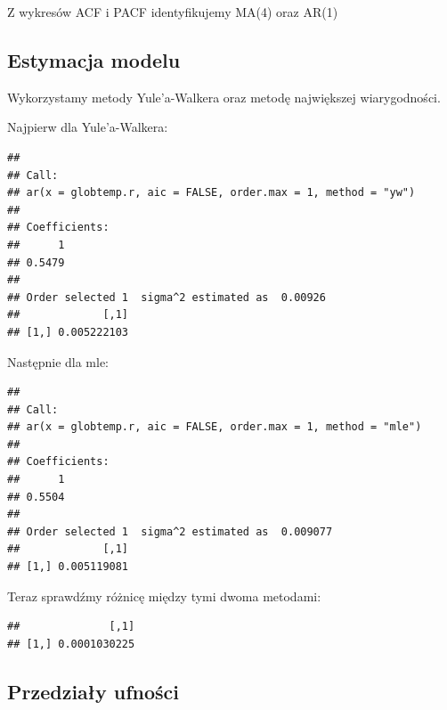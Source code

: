 \documentclass[12pt, a4paper]{article}\usepackage[]{graphicx}\usepackage[]{color}
\makeatletter
\newenvironment{kframe}{%
 \def\at@end@of@kframe{}%
 \ifinner\ifhmode%
  \def\at@end@of@kframe{\end{minipage}}%
  \begin{minipage}{\columnwidth}%
 \fi\fi%
 \def\FrameCommand##1{\hskip\@totalleftmargin \hskip-\fboxsep
 \colorbox{shadecolor}{##1}\hskip-\fboxsep
     \hskip-\linewidth \hskip-\@totalleftmargin \hskip\columnwidth}%
 \MakeFramed {\advance\hsize-\width
   \@totalleftmargin\z@ \linewidth\hsize
   \@setminipage}}%
 {\par\unskip\endMakeFramed%
 \at@end@of@kframe}
\newenvironment{knitrout}{}{} %
\makeatother
\begin{document}
Z wykresów ACF i PACF identyfikujemy MA(4) oraz AR(1)

\subsection{Estymacja modelu}

Wykorzystamy metody Yule'a-Walkera oraz metodę największej wiarygodności.

Najpierw dla Yule'a-Walkera:

\begin{knitrout}
\color{fgcolor}\begin{kframe}
\begin{verbatim}
## 
## Call:
## ar(x = globtemp.r, aic = FALSE, order.max = 1, method = "yw")
## 
## Coefficients:
##      1  
## 0.5479  
## 
## Order selected 1  sigma^2 estimated as  0.00926
##             [,1]
## [1,] 0.005222103
\end{verbatim}
\end{kframe}
\end{knitrout}

Następnie dla mle:

\begin{knitrout}
\color{fgcolor}\begin{kframe}
\begin{verbatim}
## 
## Call:
## ar(x = globtemp.r, aic = FALSE, order.max = 1, method = "mle")
## 
## Coefficients:
##      1  
## 0.5504  
## 
## Order selected 1  sigma^2 estimated as  0.009077
##             [,1]
## [1,] 0.005119081
\end{verbatim}
\end{kframe}
\end{knitrout}

Teraz sprawdźmy różnicę między tymi dwoma metodami:

\begin{knitrout}
\color{fgcolor}\begin{kframe}
\begin{verbatim}
##              [,1]
## [1,] 0.0001030225
\end{verbatim}
\end{kframe}
\end{knitrout}

\subsection{Przedziały ufności}
\end{document}
